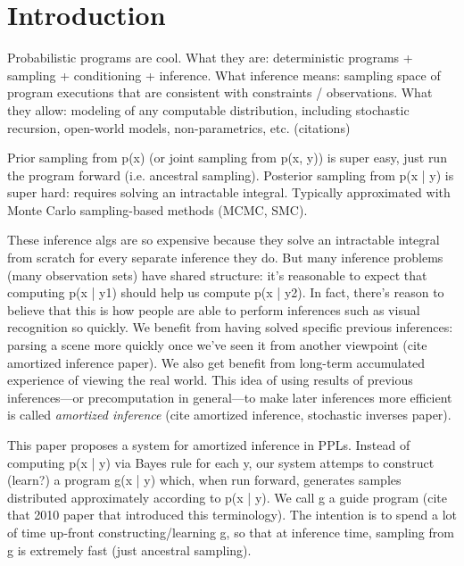 \section{Introduction}
\label{sec:introduction}


Probabilistic programs are cool.
What they are: deterministic programs + sampling + conditioning + inference.
What inference means: sampling space of program executions that are consistent with constraints / observations.
What they allow: modeling of any computable distribution, including stochastic recursion, open-world models, non-parametrics, etc. (citations)


Prior sampling from p(x) (or joint sampling from p(x, y)) is super easy, just run the program forward (i.e. ancestral sampling).
Posterior sampling from p(x | y) is super hard: requires solving an intractable integral.
Typically approximated with Monte Carlo sampling-based methods (MCMC, SMC).


These inference algs are so expensive because they solve an intractable integral from scratch for every separate inference they do.
But many inference problems (many observation sets) have shared structure: it's reasonable to expect that computing p(x | y1) should help us compute p(x | y2).
In fact, there's reason to believe that this is how people are able to perform inferences such as visual recognition so quickly.
We benefit from having solved specific previous inferences: parsing a scene more quickly once we've seen it from another viewpoint (cite amortized inference paper).
We also get benefit from long-term accumulated experience of viewing the real world.
This idea of using results of previous inferences---or precomputation in general---to make later inferences more efficient is called \emph{amortized inference} (cite amortized inference, stochastic inverses paper).


This paper proposes a system for amortized inference in PPLs.
Instead of computing p(x | y) via Bayes rule for each y, our system attemps to construct (learn?) a program g(x | y) which, when run forward, generates samples distributed approximately according to p(x | y).
We call g a guide program (cite that 2010 paper that introduced this terminology).
The intention is to spend a lot of time up-front constructing/learning g, so that at inference time, sampling from g is extremely fast (just ancestral sampling).

